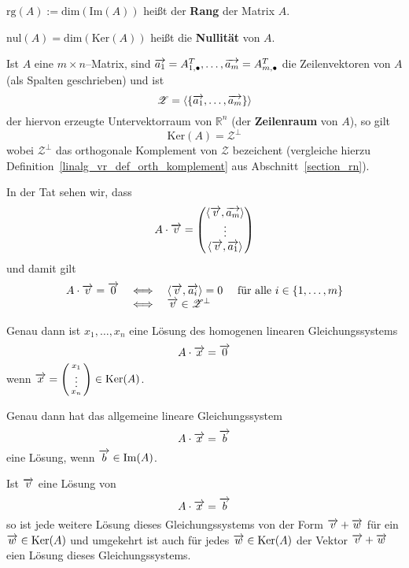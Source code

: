 \begin{definition} $\textrm{rg}(A) := \textrm{dim}(\textrm{Im}(A))$ heißt 
der \textbf{Rang} der Matrix $A$.

$\textrm{nul}(A) = \textrm{dim}(\textrm{Ker}(A))$ heißt die
\textbf{Nullität} von $A$.
\end{definition}

\begin{notiz} Ist $A$ eine $m \times n$--Matrix, sind $\overrightarrow{a_1} = A^T_{1, \bullet}, \ldots, 
\overrightarrow{a_m} = A^T_{m, \bullet}$ die Zeilenvektoren von $A$ (als Spalten geschrieben) und ist 
  	$$ \mathscr{Z} = \langle \{ \overrightarrow{a_1}, \ldots, \overrightarrow{a_m} \} \rangle $$
der hiervon erzeugte Untervektorraum von $\mathbb R^n$ (der \textbf{Zeilenraum} von $A$), so gilt
  	$$   \mathrm{Ker}(A) = \mathscr{Z}^{\perp} $$
wobei $ \mathscr{Z}^{\perp}$ das orthogonale Komplement von $ \mathscr{Z}$ bezeichent (vergleiche 
hierzu Definition~\ref{linalg_vr_def_orth_komplement} aus Abschnitt~\ref{section_rn}).

In der Tat sehen wir, dass 
  	$$ A \cdot \overrightarrow{v} = \left( \begin{matrix} \langle  \overrightarrow{v},  \overrightarrow{a_m} \rangle \\ 
	\vdots \\ \langle  \overrightarrow{v},  \overrightarrow{a_1} \rangle \end{matrix} \right) $$
und damit gilt
  	$$ \begin{array} {l c l}
  	A \cdot \overrightarrow{v} = \overrightarrow{0} & \iff & \langle  \overrightarrow{v},  \overrightarrow{a_i} \rangle 
	= 0 \quad \textrm{ für alle } i \in \{1, \ldots, m \} \\
 	& \iff &  \overrightarrow{v} \in  \mathscr{Z}^{\perp} 
  	\end{array} $$
\end{notiz}

\medbreak

\begin{satz}\label{gls_loesung_ker} Genau dann ist $x_1, \ldots, x_n$ eine Lösung 
des homogenen linearen Gleichungssystems 
  	$$ A \cdot \overrightarrow{x} = \overrightarrow{0} $$
wenn $\overrightarrow{x} 
= \left( \begin{smallmatrix} x_1 \\ \vdots \\ x_n \end{smallmatrix} \right)
\in\textrm{Ker}(A)$.

Genau dann hat das allgemeine lineare Gleichungssystem 
  	$$ A \cdot \overrightarrow{x} = \overrightarrow{b} $$
eine Lösung, wenn $\overrightarrow{b} \in \textrm{Im}(A)$.

Ist $\overrightarrow{v}$ eine Lösung von 
  	$$ A \cdot \overrightarrow{x} = \overrightarrow{b} $$
so ist jede weitere Lösung dieses Gleichungssystems von der Form $\overrightarrow{v} 
+ \overrightarrow{w}$ für ein $\overrightarrow{w} \in \textrm{Ker}(A)$ und umgekehrt 
ist auch für jedes $\overrightarrow{w} \in \textrm{Ker}(A)$ der Vektor 
$\overrightarrow{v} + \overrightarrow{w}$ eien Lösung dieses Gleichungssystems.
\end{satz}

